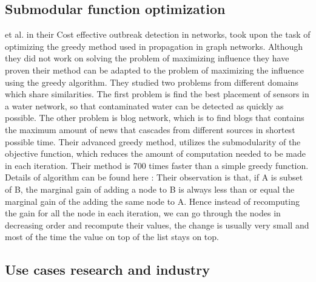 \documentclass[english]{tktltiki}
\begin{document}
\subsection{Submodular function optimization}
\cite{Leskovec07} et al. in their Cost effective outbreak detection in networks, took upon the task of optimizing the greedy method used in propagation in graph networks. Although they did not work on solving the problem of maximizing influence they have proven their method can be adapted to the problem of maximizing the influence using the greedy algorithm. They studied two problems from different domains which share similarities. The first problem is find the best placement of sensors in a water network, so that contaminated water can be detected as quickly as possible. The other problem is blog network, which is to find blogs that contains the maximum amount of news that cascades from different sources in shortest possible time. Their advanced greedy method, utilizes the submodularity of the objective function, which reduces the amount of computation needed to be made in each iteration. Their method is 700 times faster than a simple greedy function. Details of algorithm can be found here :
Their observation is that, if A is subset of B, the marginal gain of adding a node to B is always less than or equal the marginal gain of the adding the same node to A. Hence instead of recomputing the gain for all the node in each iteration, we can go through the nodes in decreasing order and recompute their values, the change is usually very small and most of the time the value on top of the list stays on top. 

\subsection{Use cases research and industry}
\end{document}
